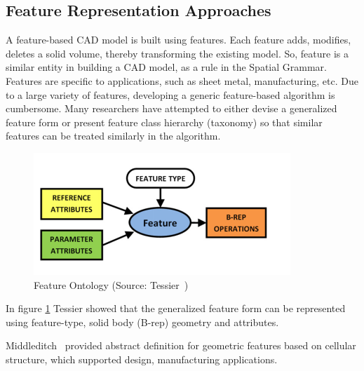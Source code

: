 \subsection{Feature Representation Approaches}

A feature-based CAD model is built using features. Each feature adds, modifies, deletes a solid volume, thereby transforming the existing model. So, feature is a similar entity in building a CAD model, as a rule in the Spatial Grammar. Features are specific to applications, such as sheet metal, manufacturing, etc. Due to a large variety of features, developing a generic feature-based algorithm is cumbersome. Many researchers have attempted to either devise a generalized feature form or present feature class hierarchy (taxonomy) so that similar features can be treated similarly in the algorithm. 



	\begin{figure}[!h]
	\centering
	\includegraphics[width=0.5\linewidth]{images/OntologyTessier}
	\caption{Feature Ontology (Source: Tessier~\cite{Tessier2013})}
	\label{fig:litsurvey:Tessier}
	\end{figure}



	  
In figure \ref{fig:litsurvey:Tessier} Tessier showed that the generalized feature form can be represented using feature-type, solid body (B-rep) geometry and attributes. 
	  
Middleditch~\cite{Middleditch1997} provided abstract definition for geometric features based on cellular structure, which supported design, manufacturing applications. 

